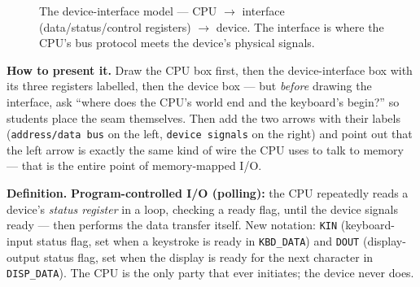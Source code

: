 \documentclass[11pt]{article}
\begin{document}
\begin{figure}[h]
  \centering
  \caption{The device-interface model --- CPU $\to$ interface (data/status/control registers) $\to$ device. The interface is where the CPU's bus protocol meets the device's physical signals.}
  \label{fig:device-interface}
\end{figure}

\textbf{How to present it.} Draw the CPU box first, then the device-interface box with its three registers labelled, then the device box --- but \emph{before} drawing the interface, ask ``where does the CPU's world end and the keyboard's begin?'' so students place the seam themselves. Then add the two arrows with their labels (\texttt{address/data bus} on the left, \texttt{device signals} on the right) and point out that the left arrow is exactly the same kind of wire the CPU uses to talk to memory --- that is the entire point of memory-mapped I/O.

\textbf{Definition.} \textbf{Program-controlled I/O (polling):} the CPU repeatedly reads a device's \emph{status register} in a loop, checking a ready flag, until the device signals ready --- then performs the data transfer itself. New notation: \texttt{KIN} (keyboard-input status flag, set when a keystroke is ready in \texttt{KBD\_DATA}) and \texttt{DOUT} (display-output status flag, set when the display is ready for the next character in \texttt{DISP\_DATA}). The CPU is the only party that ever initiates; the device never does.
\end{document}
